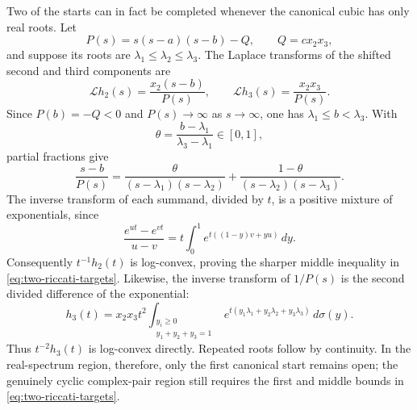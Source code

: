 \documentclass[11pt]{article}
\theoremstyle{remark}
\begin{document}
Two of the starts can in fact be completed whenever the canonical cubic has
only real roots.  Let
\[
 P(s)=s(s-a)(s-b)-Q,
 \qquad Q=cx_2x_3,
\]
and suppose its roots are
$\lambda_1\leq\lambda_2\leq\lambda_3$.  The Laplace transforms of the
shifted second and third components are
\[
 \mathcal L h_2(s)=\frac{x_2(s-b)}{P(s)},
 \qquad
 \mathcal L h_3(s)=\frac{x_2x_3}{P(s)}.
\]
Since $P(b)=-Q<0$ and $P(s)\to\infty$ as $s\to\infty$, one has
$\lambda_1\leq b<\lambda_3$.  With
\[
 \theta=\frac{b-\lambda_1}{\lambda_3-\lambda_1}\in[0,1],
\]
partial fractions give
\begin{equation}\label{eq:middle-divided-difference}
 \frac{s-b}{P(s)}
 =\frac{\theta}{(s-\lambda_1)(s-\lambda_2)}
  +\frac{1-\theta}{(s-\lambda_2)(s-\lambda_3)}.
\end{equation}
The inverse transform of each summand, divided by $t$, is a positive
mixture of exponentials, since
\[
 \frac{e^{ut}-e^{vt}}{u-v}
 =t\int_0^1e^{t((1-y)v+yu)}\,dy.
\]
Consequently $t^{-1}h_2(t)$ is log-convex, proving the sharper middle
inequality in \eqref{eq:two-riccati-targets}.  Likewise, the inverse transform
of $1/P(s)$ is the second divided difference of the exponential:
\[
 h_3(t)=x_2x_3t^2
 \int_{\substack{y_i\geq0\\y_1+y_2+y_3=1}}
 e^{t(y_1\lambda_1+y_2\lambda_2+y_3\lambda_3)}\,d\sigma(y).
\]
Thus $t^{-2}h_3(t)$ is log-convex directly.  Repeated roots follow by
continuity.  In the real-spectrum region, therefore, only the first canonical
start remains open; the genuinely cyclic complex-pair region still requires
the first and middle bounds in \eqref{eq:two-riccati-targets}.
\end{document}
